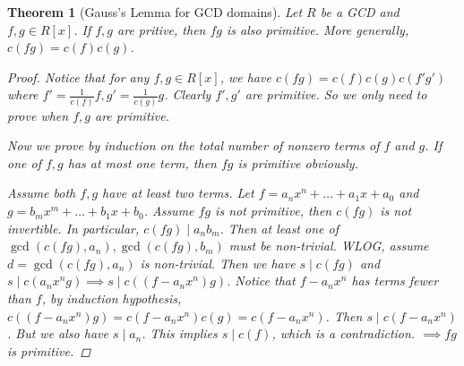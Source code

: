 \documentclass[a4paper]{article}
\theoremstyle{mystyle}
\newtheorem{theorem}{Theorem}
\begin{document}
\begin{theorem}[Gauss's Lemma for GCD domains]
  Let $R$ be a GCD and $f, g \in R[x]$. If $f, g$ are pritive, then $fg$
  is also primitive. More generally, $c(fg) = c(f)c(g)$.
  \begin{proof}
    Notice that for any $f, g \in R[x]$, we have
    $c(fg) = c(f)c(g)c(f'g')$ where $f' = \frac{1}{c(f)} f, g' = \frac{1}{c(g)} g$.
    Clearly $f', g'$ are primitive. So we only need to prove when
    $f, g$ are primitive.

    Now we prove by induction on the total number of nonzero terms of $f$ and $g$.
    If one of $f, g$ has at most one term, then $fg$ is primitive obviously.

    Assume both $f, g$ have at least two terms.
    Let $f = a_n x^n + \dots + a_1 x + a_0$ and
    $g = b_m x^m + \dots + b_1 x + b_0$.
    Assume $fg$ is not primitive, then $c(fg)$ is not invertible.
    In particular, $c(fg) \mid a_n b_m$. Then at least one of $\gcd(c(fg), a_n), \gcd(c(fg), b_m)$
    must be non-trivial. WLOG, assume $d = \gcd(c(fg), a_n)$ is non-trivial.
    Then we have $s \mid c(fg)$ and $s \mid c( a_nx^n g ) \implies
    s \mid c( (f - a_nx^n) g)$. Notice that $f - a_n x^n$ has terms fewer than
    $f$, by induction hypothesis, $c( (f - a_nx^n) g) = c(f - a_n x^n) c(g)
    = c(f - a_n x^n)$. Then $s \mid c(f - a_n x^n)$. But we also have $s \mid a_n$.
    This implies $s \mid c(f)$, which is a contradiction.
    $\implies fg$ is primitive.
  \end{proof}
\end{theorem}

% 
% 
\end{document}
